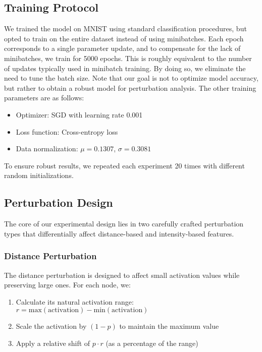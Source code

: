 \subsection{Training Protocol}
We trained the model on MNIST using standard classification procedures, but opted to train on the entire dataset instead of using minibatches. Each epoch corresponds to a single parameter update, and to compensate for the lack of minibatches, we train for 5000 epochs. This is roughly equivalent to the number of updates typically used in minibatch training. By doing so, we eliminate the need to tune the batch size. Note that our goal is not to optimize model accuracy, but rather to obtain a robust model for perturbation analysis. The other training parameters are as follows:

\begin{itemize}
    \item Optimizer: SGD with learning rate 0.001
    \item Loss function: Cross-entropy loss
    \item Data normalization: $\mu = 0.1307$, $\sigma = 0.3081$
\end{itemize}

To ensure robust results, we repeated each experiment 20 times with different random initializations.

\subsection{Perturbation Design}
The core of our experimental design lies in two carefully crafted perturbation types that differentially affect distance-based and intensity-based features.

\subsubsection{Distance Perturbation}
The distance perturbation is designed to affect small activation values while preserving large ones. For each node, we:

\begin{enumerate}
    \item Calculate its natural activation range: $r = \text{max}(\text{activation}) - \text{min}(\text{activation})$
    \item Scale the activation by $(1 - p)$ to maintain the maximum value
    \item Apply a relative shift of $p \cdot r$ (as a percentage of the range)
\end{enumerate}

